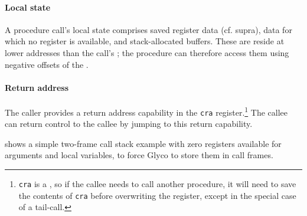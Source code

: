 \documentclass[main.tex]{subfiles}
\begin{document}
\paragraph{Local state} A procedure call's local state comprises saved register data (cf. supra), data for which no register is available, and stack-allocated buffers. These are reside at lower addresses than the call's ; the procedure can therefore access them using negative offsets of the .

\paragraph{Return address} The caller provides a return address capability in the \texttt{cra} register.\footnote{\texttt{cra} is a , so if the callee needs to call another procedure, it will need to save the contents of \texttt{cra} before overwriting the register, except in the special case of a tail-call.} The callee can return control to the callee by jumping to this return capability.

 shows a simple two-frame call stack example with zero registers available for arguments and local variables, to force Glyco to store them in call frames.
\end{document}
